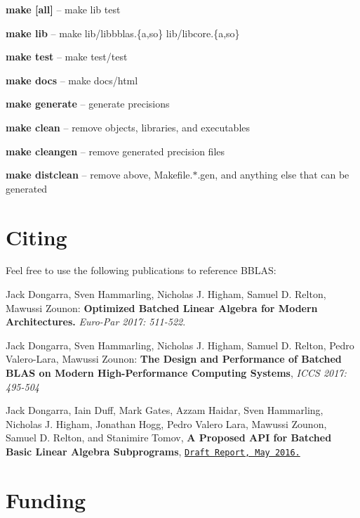 \begin{DoxyItemize}
\item {\bfseries make \mbox{[}all\mbox{]}} -- make lib test
\item {\bfseries make lib} -- make lib/libbblas.\{a,so\} lib/libcore.\{a,so\}
\item {\bfseries make test} -- make test/test
\item {\bfseries make docs} -- make docs/html
\item {\bfseries make generate} -- generate precisions
\item {\bfseries make clean} -- remove objects, libraries, and executables
\item {\bfseries make cleangen} -- remove generated precision files
\item {\bfseries make distclean} -- remove above, Makefile.$\ast$.gen, and anything else that can be generated
\end{DoxyItemize}

\section*{Citing }

Feel free to use the following publications to reference B\+B\+L\+AS\+:


\begin{DoxyItemize}
\item Jack Dongarra, Sven Hammarling, Nicholas J. Higham, Samuel D. Relton, Mawussi Zounon\+: {\bfseries Optimized Batched Linear Algebra for Modern Architectures.} {\itshape Euro-\/\+Par 2017\+: 511-\/522}.
\item Jack Dongarra, Sven Hammarling, Nicholas J. Higham, Samuel D. Relton, Pedro Valero-\/\+Lara, Mawussi Zounon\+: {\bfseries The Design and Performance of Batched B\+L\+AS on Modern High-\/\+Performance Computing Systems}, {\itshape I\+C\+CS 2017\+: 495-\/504}
\item Jack Dongarra, Iain Duff, Mark Gates, Azzam Haidar, Sven Hammarling, Nicholas J. Higham, Jonathan Hogg, Pedro Valero Lara, Mawussi Zounon, Samuel D. Relton, and Stanimire Tomov, {\bfseries A Proposed A\+PI for Batched Basic Linear Algebra Subprograms}, \href{https://www.dropbox.com/s/olocmipyxfvcaui/batched_api_03_30_2016.pdf?dl=0}{\tt Draft Report, May 2016.}
\end{DoxyItemize}

\section*{Funding }

